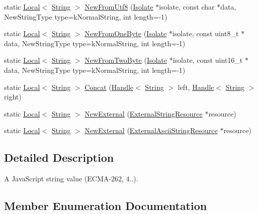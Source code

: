 \begin{DoxyCompactItemize}
\item 
static \hyperlink{classv8_1_1_local}{Local}$<$ \hyperlink{classv8_1_1_string}{String} $>$ \hyperlink{classv8_1_1_string_aa4b8c052f5108ca6350c45922602b9d4}{New\+From\+Utf8} (\hyperlink{classv8_1_1_isolate}{Isolate} $\ast$isolate, const char $\ast$data, New\+String\+Type type=k\+Normal\+String, int length=-\/1)
\item 
static \hyperlink{classv8_1_1_local}{Local}$<$ \hyperlink{classv8_1_1_string}{String} $>$ \hyperlink{classv8_1_1_string_afa8026ed1337564a9fd15dc56aceaa83}{New\+From\+One\+Byte} (\hyperlink{classv8_1_1_isolate}{Isolate} $\ast$isolate, const uint8\+\_\+t $\ast$data, New\+String\+Type type=k\+Normal\+String, int length=-\/1)
\item 
static \hyperlink{classv8_1_1_local}{Local}$<$ \hyperlink{classv8_1_1_string}{String} $>$ \hyperlink{classv8_1_1_string_a876615eb027092a6a71a4e7d69b82d00}{New\+From\+Two\+Byte} (\hyperlink{classv8_1_1_isolate}{Isolate} $\ast$isolate, const uint16\+\_\+t $\ast$data, New\+String\+Type type=k\+Normal\+String, int length=-\/1)
\item 
static \hyperlink{classv8_1_1_local}{Local}$<$ \hyperlink{classv8_1_1_string}{String} $>$ \hyperlink{classv8_1_1_string_a3d0b9c9208cf5054adb048e360fb73ff}{Concat} (\hyperlink{classv8_1_1_handle}{Handle}$<$ \hyperlink{classv8_1_1_string}{String} $>$ left, \hyperlink{classv8_1_1_handle}{Handle}$<$ \hyperlink{classv8_1_1_string}{String} $>$ right)
\item 
static \hyperlink{classv8_1_1_local}{Local}$<$ \hyperlink{classv8_1_1_string}{String} $>$ \hyperlink{classv8_1_1_string_a5b98a12b3c09f22597d2ff3f9c9f2f2d}{New\+External} (\hyperlink{classv8_1_1_string_1_1_external_string_resource}{External\+String\+Resource} $\ast$resource)
\item 
static \hyperlink{classv8_1_1_local}{Local}$<$ \hyperlink{classv8_1_1_string}{String} $>$ \hyperlink{classv8_1_1_string_adbcec9a915fabf0235f4f688cd7b4f32}{New\+External} (\hyperlink{classv8_1_1_string_1_1_external_ascii_string_resource}{External\+Ascii\+String\+Resource} $\ast$resource)
\end{DoxyCompactItemize}


\subsection{Detailed Description}
A Java\+Script string value (E\+C\+M\+A-\/262, 4..). 

\subsection{Member Enumeration Documentation}
\hypertarget{classv8_1_1_string_a9ce7f1458ffd08f8eb2b9c8dc056e616}{}
